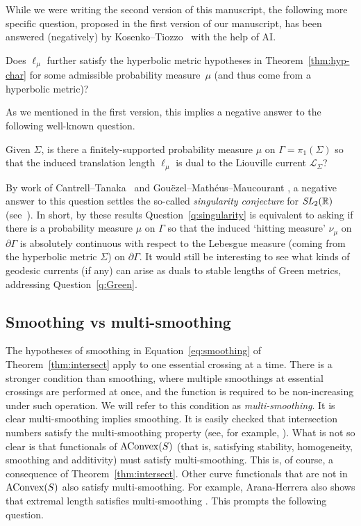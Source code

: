 While we were writing the second version of this manuscript, the following more specific question, proposed in the first version of our manuscript, has been answered (negatively) by Kosenko--Tiozzo~\cite{KS26:Singularity} with the help of AI.

\begin{question}
Does $\ell_\mu$ further satisfy the
hyperbolic metric hypotheses in Theorem~\ref{thm:hyp-char} for some admissible
probability measure~$\mu$ (and thus come
from a hyperbolic metric)?
\label{q:Green}
\end{question}

As we mentioned in the first version, this implies a negative answer to the following well-known question.

\begin{question}
Given $\Sigma$, is there a finitely-supported probability measure
$\mu$ on $\Gamma=\pi_1(\Sigma)$ so that the induced translation length
$\ell_{\mu}$ is dual to the Liouville current $\mathcal{L}_{\Sigma}$?
\label{q:singularity}
\end{question}

By work of Cantrell--Tanaka~\cite[Theorem~1.2]{CT25} and
Gouëzel--Mathéus--Maucourant \cite[Theorem~1.2]{GMM18:Entropy}, a
negative answer to this question settles the so-called
\emph{singularity conjecture} for $\operatorname{\mathit{SL}}_2(\mathbb{R})$
(see~\cite[Conjecture, page~~259]{KLP11:Singularity}). In short, by
these results Question~\ref{q:singularity} is equivalent to asking if
there is a probability measure $\mu$ on $\Gamma$ so that the induced
`hitting measure' $\nu_{\mu}$ on $\partial \Gamma$ is absolutely
continuous with respect to the Lebesgue measure (coming from the
hyperbolic metric $\Sigma$) on $\partial \Gamma$.
It would still be interesting to see what kinds of geodesic currents (if any) can arise as duals to stable lengths of Green metrics, addressing Question~\ref{q:Green}.

\subsection{Smoothing vs multi-smoothing}
\label{subsec:multismoothing}
The hypotheses of smoothing in Equation~\eqref{eq:smoothing} of Theorem~\ref{thm:intersect} apply to one essential crossing at a time. There is a stronger condition than smoothing, where multiple smoothings at essential crossings are performed at once, and the function is required to be non-increasing under such operation.
We will refer to this condition as \emph{multi-smoothing}.
It is clear multi-smoothing implies smoothing.
It is easily checked that intersection numbers satisfy the multi-smoothing property (see, for example, \cite{AH21:EffectiveCounting3}).
What is not so clear is that functionals of $\mathrm{AConvex}(S)$ (that is, satisfying stability, homogeneity, smoothing and additivity) must satisfy multi-smoothing. This is, of course, a consequence of Theorem~\ref{thm:intersect}.
Other curve functionals that are not in $\mathrm{AConvex}(S)$ also satisfy
multi-smoothing. For example, Arana-Herrera also shows
that extremal length satisfies
multi-smoothing \cite{AH21:EffectiveCounting3}.
This prompts the following question.


